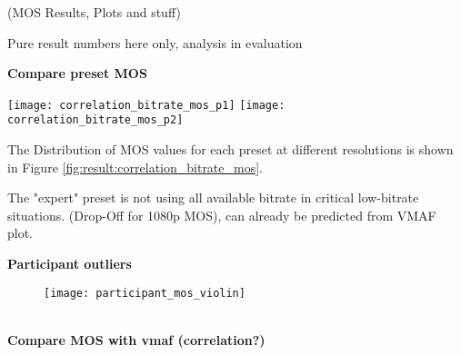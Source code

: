 (MOS Results, Plots and stuff)

Pure result numbers here only, analysis in evaluation

\textbf{Compare preset MOS}

\begin{figure*}[!t]
	\centering
	\texttt{[image: correlation\_bitrate\_mos\_p1]}
	\texttt{[image: correlation\_bitrate\_mos\_p2]}
	\caption{Correlation between bitrate and MOS for both encoding presets. The center line represents a median and the outer line the 25th and 75th percentile of MOS for the 6 sequences.}
	\label{fig:result:correlation_bitrate_mos}
\end{figure*}

The Distribution of MOS values for each preset at different resolutions is shown in Figure \ref{fig:result:correlation_bitrate_mos}.

The "expert" preset is not using all available bitrate in critical low-bitrate situations. (Drop-Off for 1080p MOS), can already be predicted from VMAF plot.


\textbf{Participant outliers}
\begin{figure}[!t]
	\centering
	\texttt{[image: participant\_mos\_violin]}
	\caption{}
	\label{fig:result:participant_violin}
\end{figure}
\\

\textbf{Compare MOS with vmaf (correlation?)}